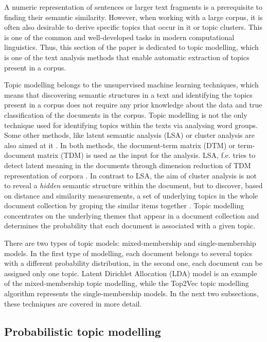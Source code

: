 \documentclass[fontsize=12pt,a4paper,twoside,openany]{scrbook}
\begin{document}
A numeric representation of sentences or larger text fragments is a prerequisite to finding their semantic similarity. However, when working with a large corpus, it is often also desirable to derive specific topics that occur in it or topic clusters. This is one of the common and well-developed tasks in modern computational linguistics. Thus, this section of the paper is dedicated to topic modelling, which is one of the text analysis methods that enable automatic extraction of topics present in a corpus.

Topic modelling belongs to the unsupervised machine learning techniques, which means that discovering semantic structures in a text and identifying the topics present in a corpus does not require any prior knowledge about the data and true classification of the documents in the corpus. Topic modelling is not the only technique used for identifying topics within the texts via analysing word groups. Some other methods, like latent semantic analysis (LSA) or cluster analysis are also aimed at it \parencite[see][]{Foltz96, Landauer2007}. In both methods, the document-term matrix (DTM) or term-document matrix (TDM) is used as the input for the analysis. LSA, f.e. tries to detect latent meaning in the documents through dimension reduction of TDM representation of corpora \parencite{Anandarajan18}. In contrast to LSA, the aim of cluster analysis is not to reveal a \emph{hidden} semantic structure within the document, but to discover, based on distance and similarity measurements, a set of underlying topics in the whole document collection by groping the similar items together \parencite{Anandarajan18}. Topic modelling concentrates on the underlying themes that appear in a document collection and determines the probability that each document is associated with a given topic. 

There are two types of topic models: mixed-membership and single-membership models. In the first type of modelling, each document belongs to several topics with a different probability distribution, in the second one, each document can be assigned only one topic. Latent Dirichlet Allocation (LDA) model is an example of the mixed-membership topic modelling, while the Top2Vec topic modelling algorithm represents the single-membership models. In the next two subsections, these techniques are covered in more detail.

\subsection{Probabilistic topic modelling}
\label{sec:lda}
\end{document}
